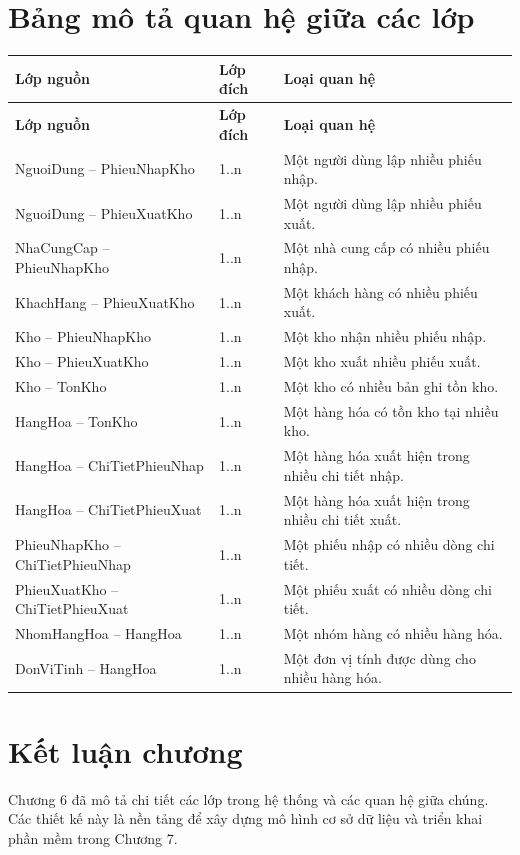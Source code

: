 \section{Bảng mô tả quan hệ giữa các lớp}

\begin{longtable}{|p{4cm}|p{4cm}|p{4.5cm}|}
\hline
\textbf{Lớp nguồn} & \textbf{Lớp đích} & \textbf{Loại quan hệ} \\
\hline
\endfirsthead
\hline
\textbf{Lớp nguồn} & \textbf{Lớp đích} & \textbf{Loại quan hệ} \\
\hline
\endhead
NguoiDung -- PhieuNhapKho & 1..n & Một người dùng lập nhiều phiếu nhập. \\
\hline
NguoiDung -- PhieuXuatKho & 1..n & Một người dùng lập nhiều phiếu xuất. \\
\hline
NhaCungCap -- PhieuNhapKho & 1..n & Một nhà cung cấp có nhiều phiếu nhập. \\
\hline
KhachHang -- PhieuXuatKho & 1..n & Một khách hàng có nhiều phiếu xuất. \\
\hline
Kho -- PhieuNhapKho & 1..n & Một kho nhận nhiều phiếu nhập. \\
\hline
Kho -- PhieuXuatKho & 1..n & Một kho xuất nhiều phiếu xuất. \\
\hline
Kho -- TonKho & 1..n & Một kho có nhiều bản ghi tồn kho. \\
\hline
HangHoa -- TonKho & 1..n & Một hàng hóa có tồn kho tại nhiều kho. \\
\hline
HangHoa -- ChiTietPhieuNhap & 1..n & Một hàng hóa xuất hiện trong nhiều chi tiết nhập. \\
\hline
HangHoa -- ChiTietPhieuXuat & 1..n & Một hàng hóa xuất hiện trong nhiều chi tiết xuất. \\
\hline
PhieuNhapKho -- ChiTietPhieuNhap & 1..n & Một phiếu nhập có nhiều dòng chi tiết. \\
\hline
PhieuXuatKho -- ChiTietPhieuXuat & 1..n & Một phiếu xuất có nhiều dòng chi tiết. \\
\hline
NhomHangHoa -- HangHoa & 1..n & Một nhóm hàng có nhiều hàng hóa. \\
\hline
DonViTinh -- HangHoa & 1..n & Một đơn vị tính được dùng cho nhiều hàng hóa. \\
\hline
\end{longtable}

\section{Kết luận chương}

Chương 6 đã mô tả chi tiết các lớp trong hệ thống và các quan hệ giữa chúng. Các thiết kế này là nền tảng để xây dựng mô hình cơ sở dữ liệu và triển khai phần mềm trong Chương 7.
